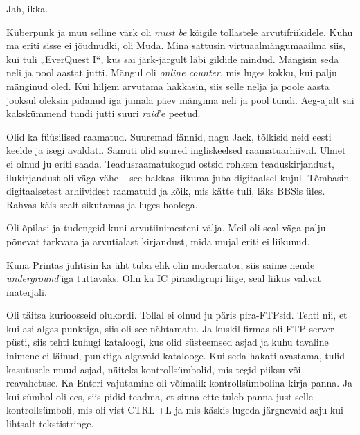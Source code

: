 
Jah, ikka.

Küberpunk ja muu selline värk oli \emph{must be} kõigile tollastele
arvutifriikidele. Kuhu ma eriti 
sisse ei jõudnudki, oli Muda. Mina sattusin virtuaalmängumaailma 
siis, kui tuli „EverQuest I“, kus sai 
järk-järgult läbi gildide mindud. Mängisin seda neli ja pool aastat jutti. 
Mängul oli \emph{online counter}, mis luges kokku, kui palju mänginud oled. Kui hiljem arvutama hakkasin, siis selle nelja ja poole aasta jooksul oleksin pidanud iga jumala 
päev mängima neli ja pool tundi. Aeg-ajalt sai 
kakskümmend tundi jutti suuri \emph{raid}'e peetud.


Olid ka füüsilised raamatud. Suuremad fännid, nagu Jack, tõlkisid neid eesti keelde ja isegi 
avaldati. Samuti olid suured ingliskeelsed raamatuarhiivid. Ulmet ei olnud ju eriti saada. Teadusraamatukogud ostsid rohkem 
teaduskirjandust, ilukirjandust oli väga vähe -- see hakkas liikuma 
juba digitaalsel kujul. Tõmbasin digitaalsetest arhiividest raamatuid ja kõik, mis kätte tuli, läks
BBSis üles. Rahvas käis sealt
sikutamas ja luges hoolega. 


Oli õpilasi ja tudengeid kuni arvutiinimesteni välja. Meil 
oli seal väga palju põnevat tarkvara ja arvutialast kirjandust, mida mujal eriti ei liikunud. 

Kuna Printas juhtisin ka üht tuba ehk olin moderaator, siis saime nende 
\emph{underground}'iga tuttavaks. Olin ka IC piraadigrupi liige, 
seal liikus vahvat materjali. 

Oli täitsa kurioosseid olukordi. Tollal 
ei olnud ju päris pira-FTPsid. Tehti nii, et kui asi algas 
punktiga, siis oli see nähtamatu. Ja kuskil firmas oli FTP-server püsti, 
siis tehti kuhugi kataloogi, kus olid süsteemsed asjad ja 
kuhu tavaline inimene ei läinud, punktiga algavaid katalooge. Kui seda 
hakati avastama, tulid kasutusele muud asjad, näiteks 
kontrollsümbolid, mis tegid piiksu või reavahetuse. 
Ka Enteri vajutamine oli võimalik 
kontrollsümbolina kirja panna. Ja kui sümbol oli ees, siis pidid 
teadma, et sinna ette tuleb panna just selle kontrollsümboli, mis oli vist CTRL +L ja mis 
käskis lugeda järgnevaid asju kui lihtsalt tekstistringe.


